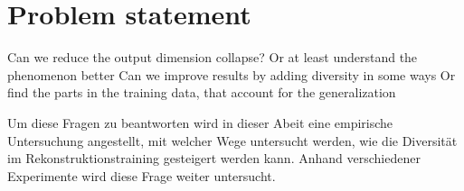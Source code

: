 












\section{Problem statement}
Can we reduce the output dimension collapse?
    Or at least understand the phenomenon better
Can we improve results by adding diversity in some ways
    Or find the parts in the training data, that account for the generalization

Um diese Fragen zu beantworten wird in dieser Abeit eine empirische Untersuchung angestellt, mit welcher Wege untersucht werden, wie die Diversität im Rekonstruktionstraining gesteigert werden kann. Anhand verschiedener Experimente wird diese Frage weiter untersucht. 